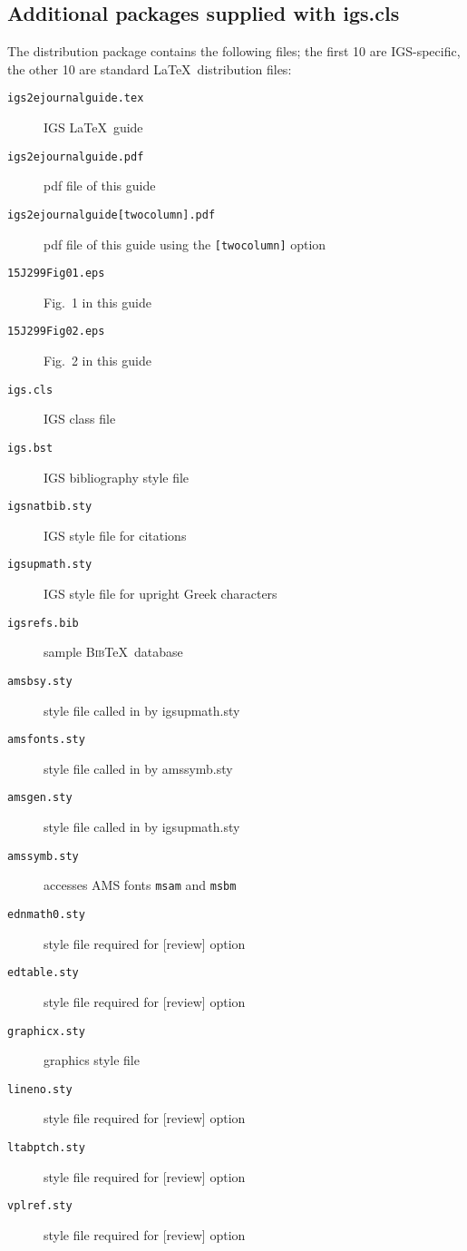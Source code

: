 \documentclass[review,oneside]{igs}
\begin{document}
\subsection{Additional packages supplied with igs.cls}
The distribution package contains the following files; the first 10 are IGS-specific, the other 10 are standard \LaTeX\ distribution files:\\[-0.5\baselineskip]
\begin{description}
\item [\texttt{igs2ejournalguide.tex}]\enskip   IGS \LaTeX\ guide
\item [\texttt{igs2ejournalguide.pdf}]\enskip   pdf file of this guide
\item [\texttt{igs2ejournalguide[twocolumn].pdf}]\enskip pdf file of this guide using the \verb"[twocolumn]" option
\item [\texttt{15J299Fig01.eps}]\enskip         Fig.~1 in this guide
\item [\texttt{15J299Fig02.eps}]\enskip         Fig.~2 in this guide
\item [\texttt{igs.cls}]\enskip                 IGS class file
\item [\texttt{igs.bst}]\enskip                 IGS bibliography style file
\item [\texttt{igsnatbib.sty}]\enskip           IGS style file for citations
\item [\texttt{igsupmath.sty}]\enskip           IGS style file for upright Greek characters
\item [\texttt{igsrefs.bib}]\enskip             sample \textsc{Bib}\TeX\ database
\item [\texttt{amsbsy.sty}]\enskip              style file called in by igsupmath.sty
\item [\texttt{amsfonts.sty}]\enskip            style file called in by amssymb.sty
\item [\texttt{amsgen.sty}]\enskip              style file called in by igsupmath.sty
\item [\texttt{amssymb.sty}]\enskip             accesses AMS fonts \verb"msam" and \verb"msbm"
\item [\texttt{ednmath0.sty}]\enskip            style file required for [review] option
\item [\texttt{edtable.sty}]\enskip             style file required for [review] option
\item [\texttt{graphicx.sty}]\enskip            graphics style file
\item [\texttt{lineno.sty}]\enskip              style file required for [review] option
\item [\texttt{ltabptch.sty}]\enskip            style file required for [review] option
\item [\texttt{vplref.sty}]\enskip              style file required for [review] option
\end{description}
\end{document}
